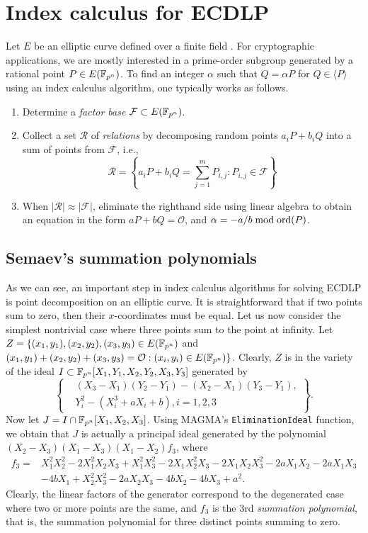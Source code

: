 %
%

\section{Index calculus for ECDLP}
%
\label{sec:index-calculus-ecdlp}
%
Let $E$ be an elliptic curve defined over a finite field .
%
For cryptographic applications, we are mostly interested in a
prime-order subgroup generated by a rational point $P\in E(\mathbb F_{p^n})$.
%
To find an integer $\alpha$ such that $Q=\alpha P$ for
$Q\in\langle P\rangle$ using an index calculus algorithm, one
typically works as follows.
%
\begin{enumerate}
%
\item Determine a \emph{factor base} $\mathcal F\subset E(\mathbb F_{p^n})$.
%
\item Collect a set $\mathcal R$ of \emph{relations} by decomposing
  random points $a_iP+b_iQ$ into a sum of points from $\mathcal F$,
  i.e.,
  \[ \mathcal
    R=\left\{a_iP+b_iQ=\sum_{j=1}^mP_{i,j}:P_{i,j}\in\mathcal
      F\right\} \]
%
\item When $|\mathcal R|\approx|\mathcal F|$, eliminate the righthand
  side using linear algebra to obtain an equation in the form
  $aP+bQ=\mathcal O$, and $\alpha=-a/b\bmod\operatorname{ord}(P)$.
%
\end{enumerate} 

\subsection{Semaev's summation polynomials}
%
\label{sec:summation-polynomials}
%
As we can see, an important step in index calculus algorithms for
solving ECDLP is point decomposition on an elliptic curve.
%
It is straightforward that if two points sum to zero, then their
$x$-coordinates must be equal.
%
Let us now consider the simplest nontrivial case where three points
sum to the point at infinity.
%
Let $Z=\{(x_1,y_1),(x_2,y_2),(x_3,y_3)\in E(\mathbb F_{p^n})$ and
$(x_1,y_1)+(x_2,y_2)+(x_3,y_3)=\mathcal O:(x_i,y_i)\in E(\mathbb F_{p^n})\}$.
%
Clearly, $Z$ is in the variety of the ideal
$I\subset\mathbb F_{p^n}[X_1,Y_1,X_2,Y_2,X_3,Y_3]$ generated by
\[ \left\{\begin{aligned}
      &  (X_3 - X_1)(Y_2 - Y_1) - (X_2 - X_1)(Y_3 - Y_1),\\
      & Y_i^2 - (X_i^3 + aX_i + b),i=1,2,3
    \end{aligned}\right\}. \]
%
Now let $J=I\cap\mathbb F_{p^n}[X_1,X_2,X_3]$.
%
Using MAGMA's \texttt{EliminationIdeal} function, we obtain that $J$
is actually a principal ideal generated by the polynomial
$(X_2 - X_3)(X_1 - X_3)(X_1 - X_2)f_3$, where \[ \begin{aligned}
    f_3 = & X_1^2X_2^2 - 2X_1^2X_2X_3 + X_1^2X_3^2 - 2X_1X_2^2X_3 - 2X_1X_2X_3^2 - 2aX_1X_2 - 2aX_1X_3 \\
    & - 4bX_1 + X_2^2X_3^2 - 2aX_2X_3 - 4bX_2 - 4bX_3 + a^2.
  \end{aligned} \]
%
Clearly, the linear factors of the generator correspond to the
degenerated case where two or more points are the same, and $f_3$ is
the 3rd \emph{summation polynomial}, that is, the summation polynomial
for three distinct points summing to zero.


